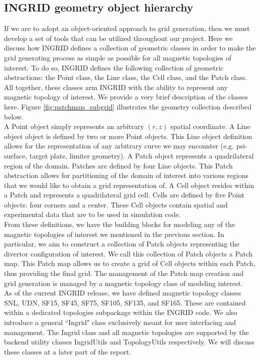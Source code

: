 \subsection{\label{sec:label2}INGRID geometry object hierarchy}
If we are to adopt an object-oriented approach to grid generation, then we must develop a set of tools that can be utilized throughout our project. Here we discuss how INGRID defines a collection of geometric classes in order to make the grid generating process as simple as possible for all magnetic topologies of interest. To do so, INGRID defines the following collection of geometric abstractions: the Point class, the Line class, the Cell class, and the Patch class. All together, these classes arm INGRID with the ability to represent any magnetic topology of interest. We provide a very brief description of the classes here. Figure \ref{fig:patchmap_subgrid} illustrates the geometry collection described below.\\
\indent
A Point object simply represents an arbitrary $(r,z)$ spatial coordinate. A Line object object is defined by two or more Point objects. This Line object definition allows for the representation of any arbitrary curve we may encounter (e.g. psi-surface, target plate, limiter geometry). A Patch object represents a quadrilateral region of the domain. Patches are defined by four Line objects. This Patch abstraction allows for partitioning of the domain of interest into various regions that we would like to obtain a grid representation of. A Cell object resides within a Patch and represents a quadrilateral grid cell. Cells are defined by five Point objects: four corners and a center. These Cell objects contain spatial and experimental data that are to be used in simulation code.\\ \indent
From these definitions, we have the building blocks for modeling any of the magnetic topologies of interest we mentioned in the previous section. In particular, we aim to construct a collection of Patch objects representing the divertor configuration of interest. We call this collection of Patch objects a Patch map. This Patch map allows us to create a grid of Cell objects within each Patch, thus providing the final grid. The management of the Patch map creation and grid generation is managed by a magnetic topology class of modeling interest. \\ \indent
As of the current INGRID release, we have defined magnetic topology classes SNL, UDN, SF15, SF45, SF75, SF105, SF135, and SF165. These are contained within a dedicated topologies subpackage within the INGRID code. We also introduce a general ``Ingrid" class exclusively meant for user interfacing and management. The Ingrid class and all magnetic topologies are supported by the backend utility classes IngridUtils and TopologyUtils respectively. We will discuss these classes at a later part of the report.
